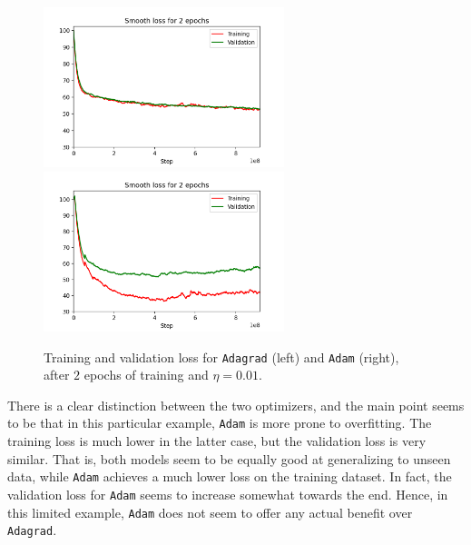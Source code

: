 \documentclass{article}
\begin{document}
	\begin{figure}[h!]
		\centering
		\includegraphics[width=7cm]{../plots/rnn_loss_v1.png}
		\includegraphics[width=7cm]{../plots/rnn_loss_v2.png}
		\caption{Training and validation loss for \texttt{Adagrad} (left) and \texttt{Adam} (right), after $2$ epochs of training and $\eta = 0.01$.}
 	\end{figure}
	There is a clear distinction between the two optimizers, and the main point seems to be that in this particular example, \texttt{Adam} is more prone to overfitting. The training loss is much lower in the latter case, but the validation loss is very similar. That is, both models seem to be equally good at generalizing to unseen data, while \texttt{Adam} achieves a much lower loss on the training dataset. In fact, the validation loss for \texttt{Adam} seems to increase somewhat towards the end. Hence, in this limited example, \texttt{Adam} does not seem to offer any actual benefit over \texttt{Adagrad}.
	
\newpage
\end{document}
